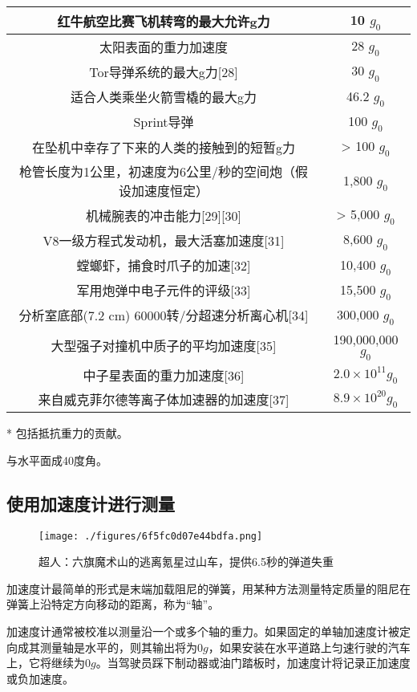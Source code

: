 \begin{table}[ht]
\begin{tabular}{|c|c}
\hline
红牛航空比赛飞机转弯的最大允许g力 & 10 $g_0$ \\
\hline
太阳表面的重力加速度 & 28 $g_0$ \\
\hline
Tor导弹系统的最大g力[28] & 30 $g_0$ \\
\hline
适合人类乘坐火箭雪橇的最大g力 & 46.2 $g_0$ \\
\hline
Sprint导弹 & 100 $g_0$ \\
\hline
在坠机中幸存了下来的人类的接触到的短暂g力 & > 100 $g_0$ \\
\hline
枪管长度为1公里，初速度为6公里/秒的空间炮（假设加速度恒定） & 1,800 $g_0$ \\
\hline
机械腕表的冲击能力[29][30] & > 5,000 $g_0$ \\
\hline
V8一级方程式发动机，最大活塞加速度[31] & 8,600 $g_0$ \\
\hline
螳螂虾，捕食时爪子的加速[32] & 10,400 $g_0$ \\
\hline
军用炮弹中电子元件的评级[33] & 15,500 $g_0$ \\
\hline
分析室底部(7.2 cm) 60000转/分超速分析离心机[34] & 300,000 $g_0$ \\
\hline
大型强子对撞机中质子的平均加速度[35] & 190,000,000 $g_0$ \\
\hline
中子星表面的重力加速度[36] & $2.0\times10^{11} g_0$ \\
\hline
来自威克菲尔德等离子体加速器的加速度[37] & $8.9\times10^{20} g_0$ \\
\hline
\end{tabular}
\end{table}
* 包括抵抗重力的贡献。

与水平面成40度角。

\subsection{使用加速度计进行测量}
\begin{figure}[ht]
\centering
\texttt{[image: ./figures/6f5fc0d07e44bdfa.png]}
\caption{超人：六旗魔术山的逃离氪星过山车，提供6.5秒的弹道失重} \label{fig_GLI_3}
\end{figure}
加速度计最简单的形式是末端加载阻尼的弹簧，用某种方法测量特定质量的阻尼在弹簧上沿特定方向移动的距离，称为“轴”。

加速度计通常被校准以测量沿一个或多个轴的重力。如果固定的单轴加速度计被定向成其测量轴是水平的，则其输出将为0$g$，如果安装在水平道路上匀速行驶的汽车上，它将继续为0$g$。当驾驶员踩下制动器或油门踏板时，加速度计将记录正加速度或负加速度。

